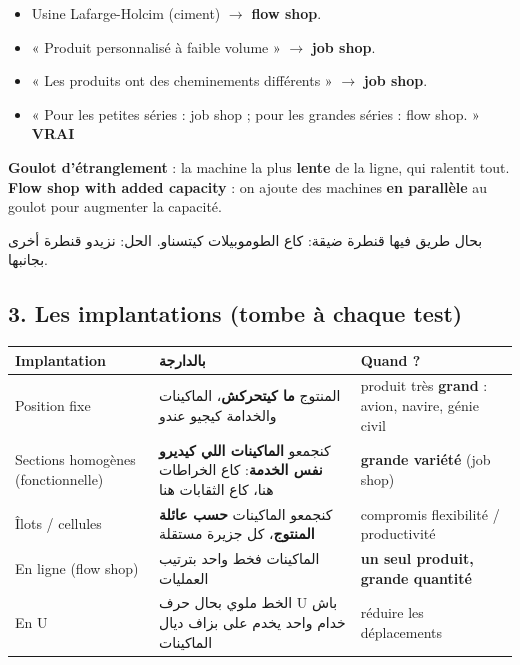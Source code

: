 \documentclass[11pt,a4paper]{article}
\newcommand{\ar}[1]{\textarabic{#1}}
\newcommand{\fr}[1]{\textfrench{#1}}
\newcommand{\vrai}{\textcolor{vert}{\textbf{VRAI}}}
\begin{document}
\begin{exemple}
\begin{itemize}
\item Usine Lafarge-Holcim (ciment) $\rightarrow$ \textbf{flow shop}.
\item « Produit personnalisé à faible volume » $\rightarrow$ \textbf{job shop}.
\item « Les produits ont des cheminements différents » $\rightarrow$ \textbf{job shop}.
\item « Pour les petites séries : job shop ; pour les grandes séries : flow shop. » \vrai
\end{itemize}
\end{exemple}

\begin{note}
\textbf{Goulot d'étranglement} : la machine la plus \textbf{lente} de la ligne, qui ralentit tout.
\textbf{Flow shop with added capacity} : on ajoute des machines \textbf{en parallèle} au goulot pour augmenter la capacité.
\par\begin{Arabic}
بحال طريق فيها قنطرة ضيقة: كاع الطوموبيلات كيتسناو. الحل: نزيدو قنطرة أخرى بجانبها.
\end{Arabic}
\end{note}

\subsection*{3. Les implantations \quad (tombe à chaque test)}
\begin{center}
\begin{tabularx}{\linewidth}{>{\raggedright\arraybackslash}p{3.6cm} >{\raggedleft\arraybackslash}X >{\raggedright\arraybackslash}X}
\toprule
\textbf{Implantation} & \ar{\textbf{بالدارجة}} & \textbf{Quand ?} \\
\midrule
Position fixe & \ar{المنتوج \textbf{ما كيتحركش}، الماكينات والخدامة كيجيو عندو} & produit très \textbf{grand} : avion, navire, génie civil \\
Sections homogènes (fonctionnelle) & \ar{كنجمعو \textbf{الماكينات اللي كيديرو نفس الخدمة}: كاع الخراطات هنا، كاع الثقابات هنا} & \textbf{grande variété} (job shop) \\
Îlots / cellules & \ar{كنجمعو الماكينات \textbf{حسب عائلة المنتوج}، كل جزيرة مستقلة} & compromis flexibilité / productivité \\
En ligne (flow shop) & \ar{الماكينات فخط واحد بترتيب العمليات} & \textbf{un seul produit, grande quantité} \\
En U & \ar{الخط ملوي بحال حرف \fr{U} باش خدام واحد يخدم على بزاف ديال الماكينات} & réduire les déplacements \\
\bottomrule
\end{tabularx}
\end{center}
\end{document}
